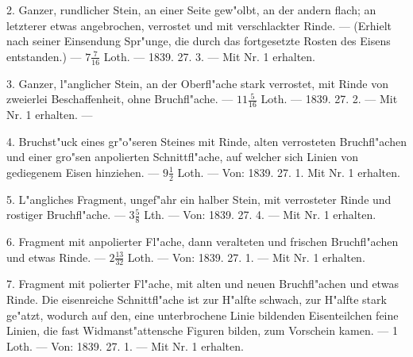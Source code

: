 \documentclass[a4paper, 11pt, oneside, polutonikogreek, german]{article}
\begin{document}
2. Ganzer, rundlicher Stein, an einer Seite gew"olbt, an der andern flach; an letzterer etwas angebrochen, verrostet und mit verschlackter Rinde. --- (Erhielt nach seiner Einsendung Spr"unge, die durch das fortgesetzte Rosten des Eisens entstanden.) --- $7\frac{7}{16}$ Loth. --- 1839. 27. 3. --- Mit Nr. 1 erhalten.

3. Ganzer, l"anglicher Stein, an der Oberfl"ache stark verrostet, mit Rinde von zweierlei Beschaffenheit, ohne Bruchfl"ache. --- $11\frac{5}{16}$ Loth. --- 1839. 27. 2. --- Mit Nr. 1 erhalten. ---

4. Bruchst"uck eines gr"o"seren Steines mit Rinde, alten verrosteten Bruchfl"achen und einer gro"sen anpolierten Schnittfl"ache, auf welcher sich Linien von gediegenem Eisen hinziehen. --- $9\frac{1}{2}$ Loth. --- Von: 1839. 27. 1. Mit Nr. 1 erhalten.

5. L"angliches Fragment, ungef"ahr ein halber Stein, mit verrosteter Rinde und rostiger Bruchfl"ache. --- $3\frac{5}{8}$ Lth. --- Von: 1839. 27. 4. --- Mit Nr. 1 erhalten.

6. Fragment mit anpolierter Fl"ache, dann veralteten und frischen Bruchfl"achen und etwas Rinde. --- $2\frac{13}{32}$ Loth. --- Von: 1839. 27. 1. --- Mit Nr. 1 erhalten.

7. Fragment mit polierter Fl"ache, mit alten und neuen Bruchfl"achen und etwas Rinde. Die eisenreiche Schnittfl"ache ist zur H"alfte schwach, zur H"alfte stark ge"atzt, wodurch auf den, eine unterbrochene Linie bildenden Eisenteilchen feine Linien, die fast Widmanst"attensche Figuren bilden, zum Vorschein kamen. --- 1 Loth. --- Von: 1839. 27. 1. --- Mit Nr. 1 erhalten.
\end{document}
